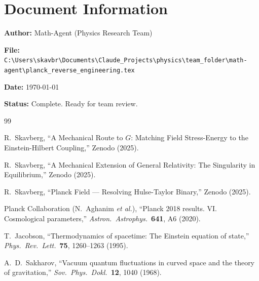 \documentclass[11pt,a4paper]{article}
\theoremstyle{definition}
\begin{document}
\section*{Document Information}

\textbf{Author:} Math-Agent (Physics Research Team)

\textbf{File:} \texttt{C:\textbackslash Users\textbackslash skavbr\textbackslash Documents\textbackslash Claude\_Projects\textbackslash physics\textbackslash team\_folder\textbackslash math-agent\textbackslash planck\_reverse\_engineering.tex}

\textbf{Date:} \today

\textbf{Status:} Complete. Ready for team review.

\begin{thebibliography}{99}

R.~Skavberg, ``A Mechanical Route to $G$: Matching Field Stress-Energy to the Einstein-Hilbert Coupling,'' Zenodo (2025).

R.~Skavberg, ``A Mechanical Extension of General Relativity: The Singularity in Equilibrium,'' Zenodo (2025).

R.~Skavberg, ``Planck Field --- Resolving Hulse-Taylor Binary,'' Zenodo (2025).

Planck Collaboration (N.~Aghanim \emph{et al.}), ``Planck 2018 results. VI. Cosmological parameters,'' \emph{Astron.\ Astrophys.}\ \textbf{641}, A6 (2020).

T.~Jacobson, ``Thermodynamics of spacetime: The Einstein equation of state,'' \emph{Phys.\ Rev.\ Lett.}\ \textbf{75}, 1260--1263 (1995).

A.~D.~Sakharov, ``Vacuum quantum fluctuations in curved space and the theory of gravitation,'' \emph{Sov.\ Phys.\ Dokl.}\ \textbf{12}, 1040 (1968).

\end{thebibliography}
\end{document}
